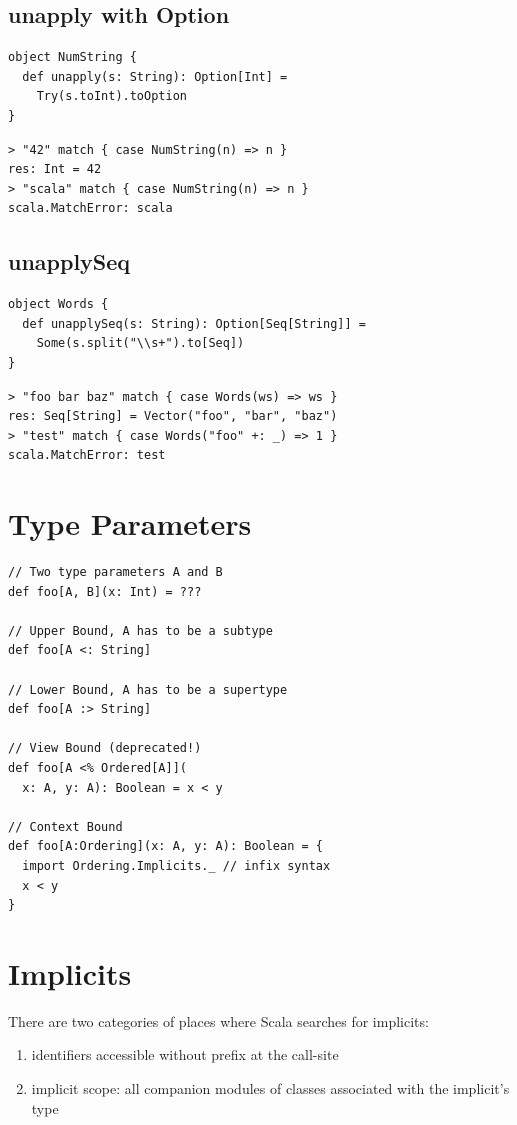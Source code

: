 \documentclass[10pt,landscape,a4paper]{article}
\newcommand{\TODO}[2][]{\todo[inline,color=green!40,linecolor=green!50,#1]{\small TODO #2}}
\begin{document}
\begin{multicols*}{4}
  \subsection{unapply with Option}

\begin{verbatim}
object NumString {
  def unapply(s: String): Option[Int] =
    Try(s.toInt).toOption
}
\end{verbatim}

\begin{verbatim}
> "42" match { case NumString(n) => n }
res: Int = 42
> "scala" match { case NumString(n) => n }
scala.MatchError: scala
\end{verbatim}

  \subsection{unapplySeq}

\begin{verbatim}
object Words {
  def unapplySeq(s: String): Option[Seq[String]] =
    Some(s.split("\\s+").to[Seq])
}
\end{verbatim}

\begin{verbatim}
> "foo bar baz" match { case Words(ws) => ws }
res: Seq[String] = Vector("foo", "bar", "baz")
> "test" match { case Words("foo" +: _) => 1 }
scala.MatchError: test
\end{verbatim}

  \section{Type Parameters}
  \TODO{}

\begin{verbatim}
// Two type parameters A and B
def foo[A, B](x: Int) = ???

// Upper Bound, A has to be a subtype
def foo[A <: String]

// Lower Bound, A has to be a supertype
def foo[A :> String]

// View Bound (deprecated!)
def foo[A <% Ordered[A]](
  x: A, y: A): Boolean = x < y

// Context Bound
def foo[A:Ordering](x: A, y: A): Boolean = {
  import Ordering.Implicits._ // infix syntax
  x < y
}
\end{verbatim}

    \section{Implicits}
  There are two categories of places where Scala searches for implicits:
  \begin{enumerate}
  \item identifiers accessible without prefix at the call-site
  \item implicit scope: all companion modules of classes associated
    with the implicit's type
  \end{enumerate}


\end{multicols*}
\end{document}
